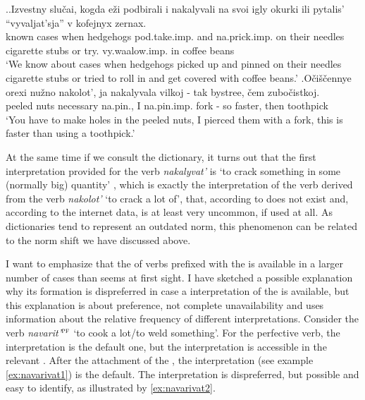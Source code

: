 \ex.\label{ex:nakalyvat}\ag.Izvestny slu\v{c}ai, kogda e\v{z}i podbirali i nakalyvali na svoi igly okurki ili pytalis' ``vyvaljat'sja'' v kofejnyx zernax.\\
known cases when hedgehogs pod.take.imp. and na.prick.imp. on their needles {cigarette stubs} or try. vy.waalow.imp. in coffee beans\\
\trans `We know about cases when hedgehogs picked up and pinned on their needles cigarette stubs or tried to roll in and get covered with coffee beans.'
\bg.O\v{c}i\v{s}\v{c}ennye orexi nu\v{z}no nakolot', ja nakalyvala vilkoj - tak bystree, \v{c}em zubo\v{c}istkoj.\\
peeled nuts necessary na.pin., I na.pin.imp. fork - so faster, then toothpick\\
\trans `You have to make holes in the peeled nuts, I pierced them with a fork, this is faster than using a toothpick.'\\

At the same time if we consult the dictionary, it turns out that the first interpretation provided for the verb \textit{nakalyvat'} is `to crack something in some (normally big) quantity' \citep{Efremova:00}, which is exactly the interpretation of the  verb derived from the verb \textit{nakolot'} `to crack a lot of', that, according to \citet{Svenonius:04b} does not exist and, according to the internet data, is at least very uncommon, if used at all. As dictionaries tend to represent an outdated norm, this phenomenon can be related to the norm shift we have discussed above.

I want to emphasize that the  of verbs prefixed with the   is available in a larger number of cases than seems at first sight. I have sketched a possible explanation why its formation is dispreferred in case a  interpretation of the  is available, but this explanation is about preference, not complete unavailability and uses information about the relative frequency of different interpretations. Consider the verb \textit{navarit'}$^{\textsc{pf}}$ `to cook a lot/to weld something'. For the perfective verb, the  interpretation is the default one, but the  interpretation is accessible in the relevant . After the attachment of the , the  interpretation (see example \ref{ex:navarivat1}) is the default. The  interpretation is dispreferred, but possible and easy to identify, as illustrated by \ref{ex:navarivat2}.

